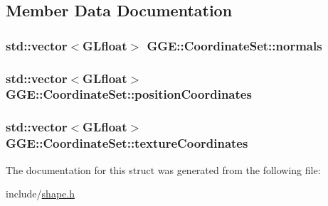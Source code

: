 \subsection{Member Data Documentation}
\hypertarget{struct_g_g_e_1_1_coordinate_set_ac58dcb73dc17eb5b2cb47c47d447ffc6}{
\subsubsection[{normals}]{\setlength{\rightskip}{0pt plus 5cm}std\+::vector$<$G\+Lfloat$>$ G\+G\+E\+::\+Coordinate\+Set\+::normals}}\label{struct_g_g_e_1_1_coordinate_set_ac58dcb73dc17eb5b2cb47c47d447ffc6}
\hypertarget{struct_g_g_e_1_1_coordinate_set_aeebb89f76ea86dc1c891eca929ca4f0e}{
\subsubsection[{position\+Coordinates}]{\setlength{\rightskip}{0pt plus 5cm}std\+::vector$<$G\+Lfloat$>$ G\+G\+E\+::\+Coordinate\+Set\+::position\+Coordinates}}\label{struct_g_g_e_1_1_coordinate_set_aeebb89f76ea86dc1c891eca929ca4f0e}
\hypertarget{struct_g_g_e_1_1_coordinate_set_ad4fd6c3ab0019aaaa1b6c5dce2f8ab53}{
\subsubsection[{texture\+Coordinates}]{\setlength{\rightskip}{0pt plus 5cm}std\+::vector$<$G\+Lfloat$>$ G\+G\+E\+::\+Coordinate\+Set\+::texture\+Coordinates}}\label{struct_g_g_e_1_1_coordinate_set_ad4fd6c3ab0019aaaa1b6c5dce2f8ab53}


The documentation for this struct was generated from the following file\+:\begin{DoxyCompactItemize}
\item 
include/\hyperlink{shape_8h}{shape.\+h}\end{DoxyCompactItemize}

